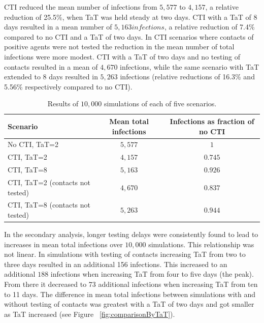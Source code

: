 \documentclass{article}
\begin{document}
CTI reduced the mean number of infections from $5,577$ to $4,157$, a relative
reduction of 25.5\%, when TaT was held steady at two days. CTI with a TaT of 8
days resulted in a mean number of $5,163 infections$, a relative reduction of 7.4\%
compared to no CTI and a TaT of two days. In CTI scenarios where contacts of
positive agents were not tested the reduction in the mean number of total
infections were more modest. CTI with a TaT of two days and no testing of contacts
resulted in a mean of $4,670$ infections, while the same scenario with TaT
extended to 8 days resulted in $5,263$ infections (relative reductions of 16.3\%
and 5.56\% respectively compared to no CTI).

\begin{table}[ht!]
  \centering
  \begin{tabular}{|l|c|c|}
    \hline
  Scenario & Mean total infections & Infections as fraction of no CTI \\ \hline
  No CTI, TaT=2 & $5,577$ & $1$  \\ \hline
  CTI, TaT=2 & $4,157$ & $0.745$  \\ \hline
  CTI, TaT=8 & $5,163$ & $0.926$  \\ \hline
  CTI, TaT=2 (contacts not tested) & $4,670$ & $0.837$  \\ \hline
  CTI, TaT=8 (contacts not tested) & $5,263$ & $0.944$  \\ \hline
\end{tabular}
  \caption{Results of $10,000$ simulations of each of five scenarios.}
  \label{table:results_scenarios}
\end{table}

In the secondary analysis, longer testing delays were consistently found to lead
to increases in mean total infections over $10,000$ simulations. This
relationship was not linear. In simulations with testing of contacts increasing
TaT from two to three days resulted in an additional 156 infections. This
increased to an additional $188$ infections when increasing TaT from four to
five days (the peak). From there it decreased to 73 additional infections when
increasing TaT from ten to 11 days. The difference in mean total infections
between simulations with and without testing of contacts was greatest with a TaT
of two days and got smaller as TaT increased (see Figure
~\ref{fig:comparisonByTaT}).
\end{document}
